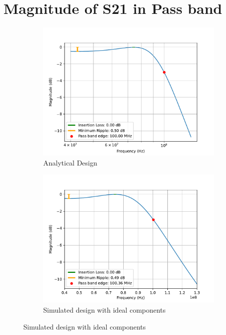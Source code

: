 \documentclass[letterpaper,12pt]{article}
\begin{document}
\section{Magnitude of S21 in Pass band}
\begin{figure}[H]
    \begin{subfigure}[t]{.49\textwidth}
      \centering
      \includegraphics[width=\linewidth]{figures/4.analytical}
      \caption{Analytical Design}
    \end{subfigure}
    \hfill
    \begin{subfigure}[t]{.49\textwidth}
      \centering
      \includegraphics[width=\linewidth]{figures/4.ideal}
      \caption{Simulated design with ideal components}
    \end{subfigure}
  

\end{figure}
\end{document}
